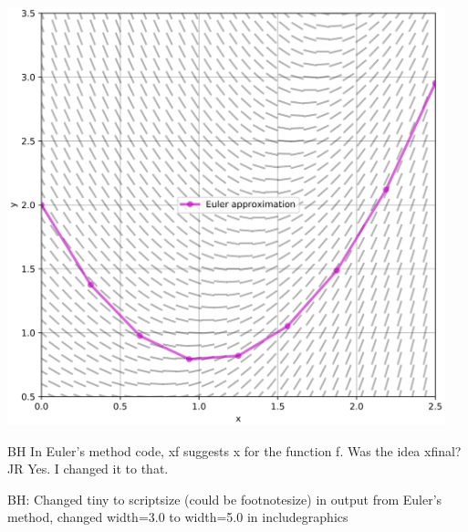 \documentclass[12pt]{book}
\begin{document}
\parbox[c]{3.1in}{\includegraphics[width=5.0in]{additional_figures/First_order_ODEs__eulers_method_svg}}

{\color{green}BH In Euler's method code, 
xf suggests x for the function f.
Was the idea xfinal? JR Yes. I changed it to that.}

{\color{green}BH: Changed tiny to scriptsize (could be footnotesize) in output from Euler's method, changed width=3.0 to width=5.0 in includegraphics}
\end{document}
